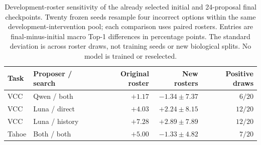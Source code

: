 \begin{table}[t]
\caption{Development-roster sensitivity of the already selected initial and 24-proposal final checkpoints. Twenty frozen seeds resample four incorrect options within the same development-intervention pool; each comparison uses paired rosters. Entries are final-minus-initial macro Top-1 differences in percentage points. The standard deviation is across roster draws, not training seeds or new biological splits. No model is trained or reselected.}
\label{tab:rebuttal-roster}
\centering\small
\setlength{\tabcolsep}{4pt}
\begin{tabular}{llrrr}
\toprule
Task & Proposer / search & Original roster & New rosters & Positive draws \\
\midrule
VCC & Qwen / both & $+1.17$ & $-1.34\pm7.37$ & $6/20$ \\
VCC & Luna / direct & $+4.03$ & $+2.24\pm8.15$ & $12/20$ \\
VCC & Luna / history & $+7.28$ & $+2.89\pm7.89$ & $12/20$ \\
Tahoe & Both / both & $+5.00$ & $-1.33\pm4.82$ & $7/20$ \\
\bottomrule
\end{tabular}
\end{table}
